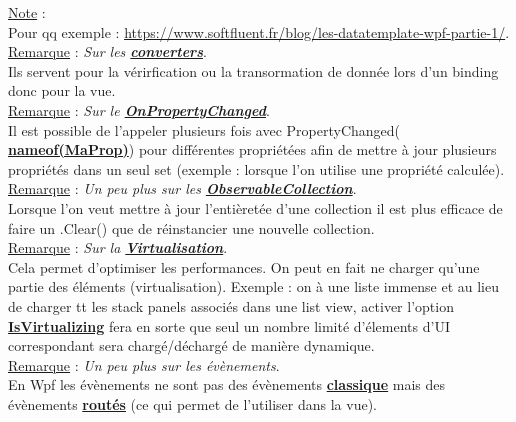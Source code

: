 \documentclass[a4paper,12pt,twoside]{article}
\newcommand{\urlcolor}{magenta}  %
\newcommand{\keycolor}{purple} %
\newcommand{\rem}[2]{\noindent\underline{Remarque} : \textit{#1}.\\ \indent #2}
\newcommand{\note}[1]{\noindent\underline{Note} : \\ \indent #1}
\newcommand{\keyref}[2]{\hypersetup{urlcolor=\keycolor} \href{#1}{\textbf{#2}}\hypersetup{urlcolor=\urlcolor}}
\begin{document}
\note{Pour qq exemple : \url{https://www.softfluent.fr/blog/les-datatemplate-wpf-partie-1/}.}\\

\rem{Sur les \keyref{https://docs.microsoft.com/en-us/dotnet/desktop/wpf/data/how-to-convert-bound-data?view=netframeworkdesktop-4.8}{converters}}{Ils servent pour la vérirfication ou la transormation de donnée lors d'un binding donc pour la vue.}\\

\rem{Sur le \keyref{https://docs.microsoft.com/en-us/dotnet/desktop/wpf/data/how-to-implement-property-change-notification?view=netframeworkdesktop-4.8}{OnPropertyChanged}}{Il est possible de l'appeler plusieurs fois avec PropertyChanged(\keyref{https://docs.microsoft.com/fr-fr/dotnet/csharp/language-reference/operators/nameof}{nameof(MaProp)}) pour différentes propriétées afin de mettre à jour plusieurs propriétés dans un seul set (exemple : lorsque l'on utilise une propriété calculée).}\\

\rem{Un peu plus sur les \keyref{https://docs.microsoft.com/fr-fr/dotnet/api/system.collections.objectmodel.observablecollection-1?view=net-6.0}{ObservableCollection}}{Lorsque l'on veut mettre à jour l'entièretée d'une collection il est plus efficace de faire un .Clear() que de réinstancier une nouvelle collection.}\\

\rem{Sur la \keyref{https://docs.microsoft.com/en-us/dotnet/desktop/wpf/advanced/optimizing-performance-controls?view=netframeworkdesktop-4.8}{Virtualisation}}{Cela permet d'optimiser les performances. On peut en fait ne charger qu'une partie des éléments (virtualisation). Exemple : on à une liste immense et au lieu de charger tt les stack panels associés dans une list view, activer l'option \keyref{https://docs.microsoft.com/en-us/dotnet/api/system.windows.controls.virtualizingstackpanel.isvirtualizing?view=netframework-4.0}{IsVirtualizing} fera en sorte que seul un nombre limité d'élements d'UI correspondant sera chargé/déchargé de manière dynamique.}\\

\rem{Un peu plus sur les évènements}{En Wpf les évènements ne sont pas des évènements \keyref{https://docs.microsoft.com/en-us/dotnet/csharp/language-reference/keywords/event}{classique} mais des évènements \keyref{https://docs.microsoft.com/en-us/dotnet/desktop/wpf/advanced/routed-events-overview?view=netframeworkdesktop-4.8}{routés} (ce qui permet de l'utiliser dans la vue).}\\
\end{document}

